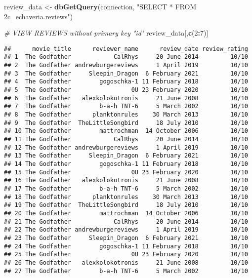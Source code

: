 \documentclass[
]{article}
\newenvironment{Shaded}{\begin{snugshade}}{\end{snugshade}}
\newcommand{\CommentTok}[1]{\textcolor[rgb]{0.56,0.35,0.01}{\textit{#1}}}
\newcommand{\DecValTok}[1]{\textcolor[rgb]{0.00,0.00,0.81}{#1}}
\newcommand{\FunctionTok}[1]{\textcolor[rgb]{0.13,0.29,0.53}{\textbf{#1}}}
\newcommand{\NormalTok}[1]{#1}
\newcommand{\OtherTok}[1]{\textcolor[rgb]{0.56,0.35,0.01}{#1}}
\newcommand{\SpecialCharTok}[1]{\textcolor[rgb]{0.81,0.36,0.00}{\textbf{#1}}}
\newcommand{\StringTok}[1]{\textcolor[rgb]{0.31,0.60,0.02}{#1}}
\begin{document}
\begin{Shaded}
\begin{Highlighting}[]
\NormalTok{review\_data }\OtherTok{\textless{}{-}} \FunctionTok{dbGetQuery}\NormalTok{(connection, }\StringTok{"SELECT * FROM 2c\_echaveria.reviews"}\NormalTok{)}


\CommentTok{\# VIEW REVIEWS without primary key "id"}
\NormalTok{review\_data[,}\FunctionTok{c}\NormalTok{(}\DecValTok{2}\SpecialCharTok{:}\DecValTok{7}\NormalTok{)]}
\end{Highlighting}
\end{Shaded}

\begin{verbatim}
##      movie_title      reviewer_name      review_date review_rating
## 1  The Godfather            CalRhys     20 June 2014         10/10
## 2  The Godfather andrewburgereviews     1 April 2019         10/10
## 3  The Godfather     Sleepin_Dragon  6 February 2021         10/10
## 4  The Godfather        gogoschka-1 11 February 2018         10/10
## 5  The Godfather                 0U 23 February 2020         10/10
## 6  The Godfather   alexkolokotronis     21 June 2008         10/10
## 7  The Godfather        b-a-h TNT-6     5 March 2002         10/10
## 8  The Godfather      planktonrules    30 March 2013         10/10
## 9  The Godfather  TheLittleSongbird     18 July 2010         10/10
## 10 The Godfather        mattrochman  14 October 2006         10/10
## 11 The Godfather            CalRhys     20 June 2014         10/10
## 12 The Godfather andrewburgereviews     1 April 2019         10/10
## 13 The Godfather     Sleepin_Dragon  6 February 2021         10/10
## 14 The Godfather        gogoschka-1 11 February 2018         10/10
## 15 The Godfather                 0U 23 February 2020         10/10
## 16 The Godfather   alexkolokotronis     21 June 2008         10/10
## 17 The Godfather        b-a-h TNT-6     5 March 2002         10/10
## 18 The Godfather      planktonrules    30 March 2013         10/10
## 19 The Godfather  TheLittleSongbird     18 July 2010         10/10
## 20 The Godfather        mattrochman  14 October 2006         10/10
## 21 The Godfather            CalRhys     20 June 2014         10/10
## 22 The Godfather andrewburgereviews     1 April 2019         10/10
## 23 The Godfather     Sleepin_Dragon  6 February 2021         10/10
## 24 The Godfather        gogoschka-1 11 February 2018         10/10
## 25 The Godfather                 0U 23 February 2020         10/10
## 26 The Godfather   alexkolokotronis     21 June 2008         10/10
## 27 The Godfather        b-a-h TNT-6     5 March 2002         10/10

\end{verbatim}
\end{document}
